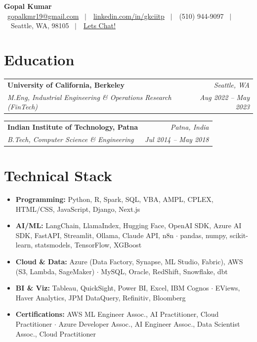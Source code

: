 \documentclass[10pt,letterpaper]{article}
\makeatletter
\newcommand{\resumeSubheading}[4]{
  \vspace{1pt}
  \begin{tabularx}{\textwidth}{@{}>{\raggedright\arraybackslash}X@{}r@{}}
    \textbf{\small #1} & \textit{\footnotesize #2} \\
    \textit{\footnotesize #3} & \textit{\footnotesize #4} \\
  \end{tabularx}
  \vspace{-1pt}
}
\makeatother
\begin{document}
\small
\enlargethispage{8\baselineskip}

\begin{center}
  {\LARGE \textbf{Gopal Kumar}} \\[2pt]
  \footnotesize
  \faEnvelope\ \href{mailto:gopalkmr19@gmail.com}{gopalkmr19@gmail.com}
  \ $\vert$\
  \faLinkedin\ \href{https://www.linkedin.com/in/gkciitp}{linkedin.com/in/gkciitp}
  \ $\vert$\
  \faPhone\ (510) 944-9097
  \ $\vert$\
  \faMapMarker*\ Seattle, WA, 98105
  \ $\vert$\
  \faComments\ \href{https://calendly.com/gopalkumar}{Lets Chat!}
\end{center}

\section{Education}

\resumeSubheading
  {University of California, Berkeley}{Seattle, WA}
  {M.Eng, Industrial Engineering \& Operations Research (FinTech)}{Aug 2022 -- May 2023}

\resumeSubheading
  {Indian Institute of Technology, Patna}{Patna, India}
  {B.Tech, Computer Science \& Engineering}{Jul 2014 -- May 2018}

\section{Technical Stack}

\begin{itemize}[leftmargin=*]
  \item \textbf{Programming:} Python, R, Spark, SQL, VBA, AMPL, CPLEX, HTML/CSS, JavaScript, Django, Next.js
  \item \textbf{AI/ML:} LangChain, LlamaIndex, Hugging Face, OpenAI SDK, Azure AI SDK, FastAPI, Streamlit, Ollama, Claude API, n8n \textbf{$\cdot$} pandas, numpy, scikit-learn, statsmodels, TensorFlow, XGBoost
  \item \textbf{Cloud \& Data:} Azure (Data Factory, Synapse, ML Studio, Fabric), AWS (S3, Lambda, SageMaker) \textbf{$\cdot$} MySQL, Oracle, RedShift, Snowflake, dbt
  \item \textbf{BI \& Viz:} Tableau, QuickSight, Power BI, Excel, IBM Cognos \textbf{$\cdot$} EViews, Haver Analytics, JPM DataQuery, Refinitiv, Bloomberg
  \item \textbf{Certifications:} AWS ML Engineer Assoc., AI Practitioner, Cloud Practitioner \textbf{$\cdot$} Azure Developer Assoc., AI Engineer Assoc., Data Scientist Assoc., Cloud Practitioner
\end{itemize}
\end{document}
